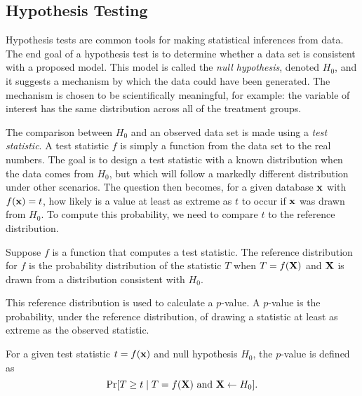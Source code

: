 \subsection{Hypothesis Testing}
Hypothesis tests are common tools for making statistical inferences from data. The end goal of a hypothesis test is to determine whether a data set is consistent with a proposed model. This model is called the \textit{null hypothesis}, denoted $H_0$, and it suggests a mechanism by which the data could have been generated. The mechanism is chosen to be scientifically meaningful, for example: the variable of interest has the same distribution across all of the treatment groups.

The comparison between $H_0$ and an observed data set is made using a \textit{test statistic}.  A test statistic $f$ is simply a function from the data set to the real numbers.  The goal is to design a test statistic with a known distribution when the data comes from $H_0$, but which will follow a markedly different distribution under other scenarios.  The question then becomes, for a given database $\mathbf{x}$ with $f(\mathbf{x})=t$, how likely is a value at least as extreme as $t$ to occur if $\mathbf{x}$ was drawn from $H_0$.  To compute this probability, we need to compare $t$ to the reference distribution.


\begin{definition} \label{def:refdist}
Suppose $f$ is a function that computes a test statistic. The reference distribution for $f$ is the probability distribution of the statistic $T$ when $T=f(\mathbf{X})$ and $\mathbf{X}$ is drawn from a distribution consistent with $H_0$.
\end{definition}

This reference distribution is used to calculate a $p$-value. A $p$-value is the probability, under the reference distribution, of drawing a statistic at least as extreme as the observed statistic.

\begin{definition}[$p$-value] \label{def:pvalue}
For a given test statistic $t=f(\mathbf{x})$ and null hypothesis $H_0$, the $p$-value is defined as
\begin{equation*}
\Pr[T\geq t \mid T = f(\mathbf{X}) \text{ and } \mathbf{X} \leftarrow H_0].
\end{equation*}
\end{definition}

